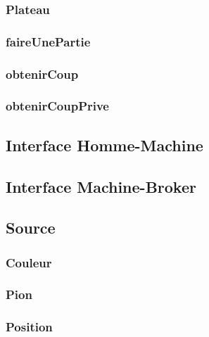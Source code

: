 \documentclass{article}
\begin{document}
\subsubsection{Plateau}


\subsubsection{faireUnePartie}


\subsubsection{obtenirCoup}


\subsubsection{obtenirCoupPrive}


\subsection{Interface Homme-Machine}


\subsection{Interface Machine-Broker}


\subsection{Source}

\subsubsection{Couleur}


\subsubsection{Pion}


\subsubsection{Position}

\end{document}
